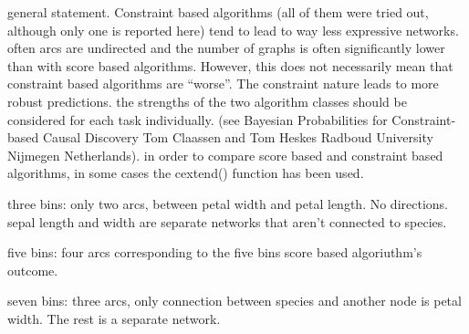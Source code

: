 \documentclass[]{article}
\newenvironment{Shaded}{\begin{snugshade}}{\end{snugshade}}
\newcommand{\KeywordTok}[1]{\textcolor[rgb]{0.13,0.29,0.53}{\textbf{{#1}}}}
\newcommand{\DataTypeTok}[1]{\textcolor[rgb]{0.13,0.29,0.53}{{#1}}}
\newcommand{\DecValTok}[1]{\textcolor[rgb]{0.00,0.00,0.81}{{#1}}}
\newcommand{\StringTok}[1]{\textcolor[rgb]{0.31,0.60,0.02}{{#1}}}
\newcommand{\NormalTok}[1]{{#1}}
\begin{document}
general statement. Constraint based algorithms (all of them were tried
out, although only one is reported here) tend to lead to way less
expressive networks. often arcs are undirected and the number of graphs
is often significantly lower than with score based algorithms. However,
this does not necessarily mean that constraint based algorithms are
``worse''. The constraint nature leads to more robust predictions. the
strengths of the two algorithm classes should be considered for each
task individually. (see Bayesian Probabilities for Constraint-based
Causal Discovery Tom Claassen and Tom Heskes Radboud University Nijmegen
Netherlands). in order to compare score based and constraint based
algorithms, in some cases the cextend() function has been used.

three bins: only two arcs, between petal width and petal length. No
directions. sepal length and width are separate networks that aren't
connected to species.

five bins: four arcs corresponding to the five bins score based
algoriuthm's outcome.

seven bins: three arcs, only connection between species and another node
is petal width. The rest is a separate network.

\begin{Shaded}
\end{Shaded}
\end{document}
